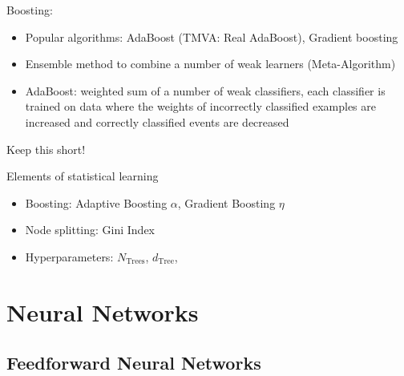 Boosting:
\begin{itemize}
\item Popular algorithms: AdaBoost (TMVA: Real AdaBoost), Gradient boosting
\item Ensemble method to combine a number of weak learners (Meta-Algorithm)
\item AdaBoost: weighted sum of a number of weak classifiers, each classifier is
  trained on data where the weights of incorrectly classified examples are
  increased and correctly classified events are decreased
\end{itemize}

Keep this short!

Elements of statistical learning \cite{esl}

\begin{itemize}
\item Boosting: Adaptive Boosting $\alpha$, Gradient Boosting $\eta$
\item Node splitting: Gini Index
\item Hyperparameters: $N_\mathrm{Trees}$, $d_\mathrm{Tree}$,
\end{itemize}

\section{Neural Networks}
\label{sec:nn}


\subsection{Feedforward Neural Networks}
\label{sec:nn_feedforward}

